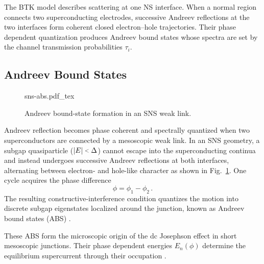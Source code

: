         The BTK model describes scattering at one NS interface. When a normal region connects two superconducting electrodes, successive Andreev reflections at the two interfaces form coherent closed electron--hole trajectories. Their phase dependent quantization produces Andreev bound states whose spectra are set by the channel transmission probabilities $\tau_i$.


    \subsection{Andreev Bound States}
    \label{subsec:meso:abs}

        \begin{figure}
            \captionsetup{format=plain}%
            \centering
            {sns-abs.pdf_tex}
            \caption{
                Andreev bound-state formation in an SNS weak link.
                }
            \label{fig:meso:abs-schematics}
        \end{figure}
        Andreev reflection becomes phase coherent and spectrally quantized when two superconductors are connected by a mesoscopic weak link. In an SNS geometry, a subgap quasiparticle ($|E|\slt{}\Delta$) cannot escape into the superconducting continua and instead undergoes successive Andreev reflections at both interfaces, alternating between electron- and hole-like character as shown in Fig.~\ref{fig:meso:abs-schematics}. One cycle acquires the phase difference
        \begin{equation}
            \phi = \phi_1 - \phi_2\,.
        \end{equation}
        The resulting constructive-interference condition quantizes the motion into discrete subgap eigenstates localized around the junction, known as Andreev bound states (ABS) \cite{andreev_thermal_1964,ishii_josephson_1970,beenakker_quantum_1992}.

        These ABS form the microscopic origin of the dc Josephson effect in short mesoscopic junctions. Their phase dependent energies $E_n(\phi)$ determine the equilibrium supercurrent through their occupation \cite{beenakker_josephson_1991, beenakker_quantum_1992}.

